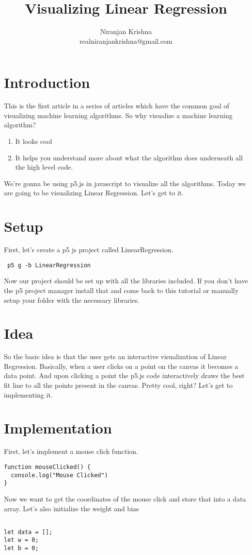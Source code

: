 \documentclass{article}
\title{\textbf{Visualizing Linear Regression}}
\author{Niranjan Krishna\\
		realniranjankrishna@gmail.com\\}
\begin{document}
\maketitle
\section{Introduction}
This is the first article in a series of articles which have the common goal of visualizing machine learning algorithms. So why visualize a machine learning algorithm?
\begin{enumerate}
\item It looks cool
\item It helps you understand more about what the algorithm does underneath all the high level code.
\end{enumerate}
We're gonna be using p5.js in javascript to visualize all the algorithms. Today we are going to be visualizing Linear Regression. Let's get to it.

\section{Setup}
First, let's create a p5 js project called LinearRegression.
\begin{verbatim}
 p5 g -b LinearRegression
 \end{verbatim}
Now our project should be set up with all the libraries included. If you don't have the p5 project manager install that and come back to this tutorial or manually setup your folder with the necessary libraries.

\section{Idea}
So the basic idea is that the user gets an interactive visualization of Linear Regression. Basically, when a user clicks on a point on the canvas it becomes a data point. And upon clicking a point the p5.js code interactively draws the best fit line to all the points present in the canvas. Pretty cool, right? Let's get to implementing it.

\section{Implementation}
First, let's implement a mouse click function.

\begin{verbatim}
function mouseClicked() {
  console.log("Mouse Clicked")
}
\end{verbatim}
Now we want to get the coordinates of the mouse click and store that into a data array. Let's also initialize the weight and bias
\begin{verbatim}

let data = [];
let w = 0;
let b = 0;
\end{verbatim}
\end{document}

